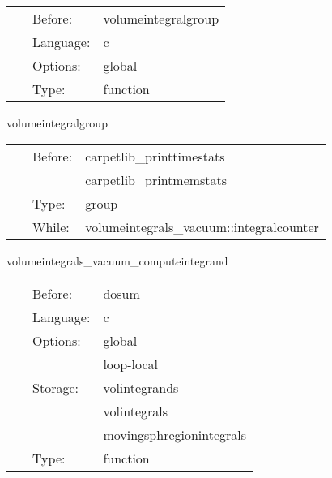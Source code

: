 \hspace{5mm}{\it initialize integralcounter variable } 


\hspace{5mm}

 \begin{tabular*}{160mm}{cll} 
~ & Before:  & volumeintegralgroup \\ 
~ & Language:  & c \\ 
~ & Options:  & global \\ 
~ & Type:  & function \\ 
\end{tabular*} 


\vspace{5mm}


\hspace{5mm} volumeintegralgroup 

\hspace{5mm}{\it evaluate all volume integrals } 


\hspace{5mm}

 \begin{tabular*}{160mm}{cll} 
~ & Before:  & carpetlib\_printtimestats \\ 
~& ~ &carpetlib\_printmemstats\\ 
~ & Type:  & group \\ 
~ & While:  & volumeintegrals\_vacuum::integralcounter \\ 
\end{tabular*} 


\vspace{5mm}


\hspace{5mm} volumeintegrals\_vacuum\_computeintegrand 

\hspace{5mm}{\it compute integrand } 


\hspace{5mm}

 \begin{tabular*}{160mm}{cll} 
~ & Before:  & dosum \\ 
~ & Language:  & c \\ 
~ & Options:  & global \\ 
~& ~ &loop-local\\ 
~ & Storage:  & volintegrands \\ 
~& ~ &volintegrals\\ 
~& ~ &movingsphregionintegrals\\ 
~ & Type:  & function \\ 
\end{tabular*} 



